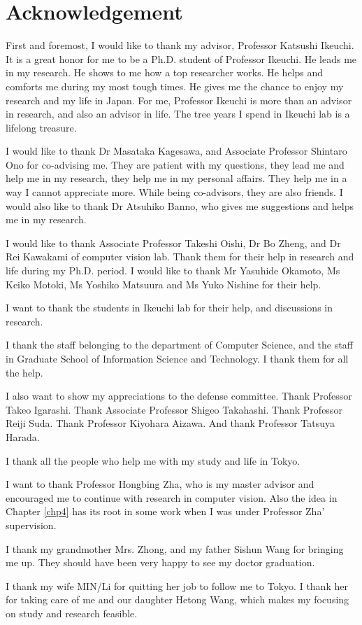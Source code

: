 

\chapter*{Acknowledgement}
%
\thispagestyle{empty}%
First and foremost, I would like to thank my advisor, Professor Katsushi Ikeuchi. It is a great honor for me to be a Ph.D. student of Professor Ikeuchi. He leads me in my research. He shows to me how a top researcher works. He helps and comforts me during my most tough times. He gives me the chance to enjoy my research and my life in Japan. For me, Professor Ikeuchi is more than an advisor in research, and also an advisor in life. The tree years I spend in Ikeuchi lab is a lifelong treasure.

I would like to thank Dr Masataka Kagesawa, and Associate Professor Shintaro Ono for co-advising me. They are patient with my questions, they lead me and help me in my research, they help me in my personal affairs. They help me in a way I cannot appreciate more. While being co-advisors, they are also friends. I would also like to thank Dr Atsuhiko Banno, who gives me suggestions and helps me in my research.

I would like to thank Associate Professor Takeshi Oishi, Dr Bo Zheng, and Dr Rei Kawakami of computer vision lab. Thank them for their help in research and life during my Ph.D. period. I would like to thank Mr Yasuhide Okamoto, Ms Keiko Motoki,  Ms Yoshiko Matsuura and Ms Yuko Nishine for their help.

I want to thank the students in Ikeuchi lab for their help, and discussions in research.

I thank the staff belonging to the department of Computer Science, and the staff in Graduate School of Information Science and Technology. I thank them for all the help.


I also want to show my appreciations to the defense  committee. Thank Professor Takeo Igarashi. Thank Associate Professor Shigeo Takahashi. Thank Professor Reiji Suda. Thank  Professor Kiyohara Aizawa. And thank Professor Tatsuya Harada.

I thank all the people who help me with my study and life in Tokyo.

I want to thank Professor Hongbing Zha, who is my master advisor and encouraged me to continue with research in computer vision. Also the idea in Chapter \ref{chp4} has its root in some work when I was under Professor Zha' supervision.

I thank my grandmother Mrs. Zhong, and my father Sishun Wang for bringing me up. They should have been very happy to see my doctor graduation.

I thank my wife MIN/Li for quitting her job to follow me to Tokyo. I thank her for taking care of me and our daughter Hetong Wang, which makes my focusing on study and research feasible.
\cleardoublepage
